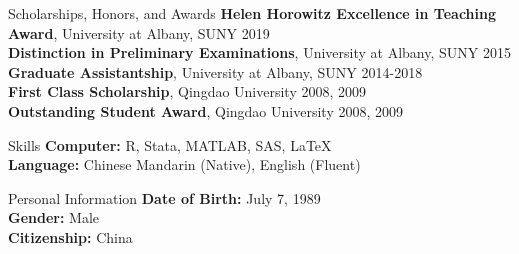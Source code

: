 \documentclass{resume_liang} %
\begin{document}
\begin{rSection}{Scholarships, Honors, and Awards} 
{\bf Helen Horowitz Excellence in Teaching Award}{, University at Albany, SUNY} \hfill{ 2019}  \vspace{0.1cm}\\ 
{\bf Distinction in Preliminary Examinations}{, University at Albany, SUNY} \hfill{ 2015}  \vspace{0.1cm}\\
{\bf Graduate Assistantship}{, University at Albany, SUNY} \hfill{ 2014-2018}  
\vspace{0.1cm}\\
{\bf First Class Scholarship}{, Qingdao University} \hfill{ 2008, 2009} 
\vspace{0.1cm}\\
{\bf Outstanding Student Award}{, Qingdao University} \hfill{ 2008, 2009} 
\vspace{0.1cm}
\end{rSection}
\bigskip \bigskip





\begin{rSection}{Skills}
{\bf Computer:} R, Stata, MATLAB, SAS, LaTeX \vspace{0.1cm} \\
{\bf Language:} Chinese Mandarin (Native), English (Fluent) 
\end{rSection}
\bigskip \bigskip









\begin{rSection}{Personal Information }
{\bf Date of Birth:} July 7, 1989  \vspace{0.1cm}\\
{\bf Gender:} Male  \vspace{0.1cm}\\
{\bf Citizenship:} China
\\
\end{rSection}
\end{document}
